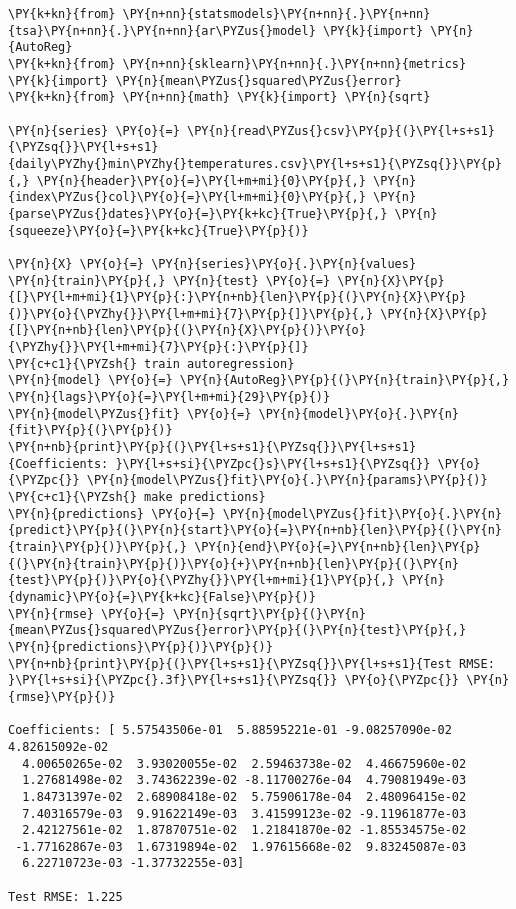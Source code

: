 \begin{tcolorbox}[breakable, size=fbox, boxrule=1pt, pad at break*=1mm,colback=cellbackground, colframe=cellborder]
\begin{Verbatim}[commandchars=\\\{\}]
\PY{k+kn}{from} \PY{n+nn}{statsmodels}\PY{n+nn}{.}\PY{n+nn}{tsa}\PY{n+nn}{.}\PY{n+nn}{ar\PYZus{}model} \PY{k}{import} \PY{n}{AutoReg}
\PY{k+kn}{from} \PY{n+nn}{sklearn}\PY{n+nn}{.}\PY{n+nn}{metrics} \PY{k}{import} \PY{n}{mean\PYZus{}squared\PYZus{}error}
\PY{k+kn}{from} \PY{n+nn}{math} \PY{k}{import} \PY{n}{sqrt}

\PY{n}{series} \PY{o}{=} \PY{n}{read\PYZus{}csv}\PY{p}{(}\PY{l+s+s1}{\PYZsq{}}\PY{l+s+s1}{daily\PYZhy{}min\PYZhy{}temperatures.csv}\PY{l+s+s1}{\PYZsq{}}\PY{p}{,} \PY{n}{header}\PY{o}{=}\PY{l+m+mi}{0}\PY{p}{,} \PY{n}{index\PYZus{}col}\PY{o}{=}\PY{l+m+mi}{0}\PY{p}{,} \PY{n}{parse\PYZus{}dates}\PY{o}{=}\PY{k+kc}{True}\PY{p}{,} \PY{n}{squeeze}\PY{o}{=}\PY{k+kc}{True}\PY{p}{)}

\PY{n}{X} \PY{o}{=} \PY{n}{series}\PY{o}{.}\PY{n}{values}
\PY{n}{train}\PY{p}{,} \PY{n}{test} \PY{o}{=} \PY{n}{X}\PY{p}{[}\PY{l+m+mi}{1}\PY{p}{:}\PY{n+nb}{len}\PY{p}{(}\PY{n}{X}\PY{p}{)}\PY{o}{\PYZhy{}}\PY{l+m+mi}{7}\PY{p}{]}\PY{p}{,} \PY{n}{X}\PY{p}{[}\PY{n+nb}{len}\PY{p}{(}\PY{n}{X}\PY{p}{)}\PY{o}{\PYZhy{}}\PY{l+m+mi}{7}\PY{p}{:}\PY{p}{]}
\PY{c+c1}{\PYZsh{} train autoregression}
\PY{n}{model} \PY{o}{=} \PY{n}{AutoReg}\PY{p}{(}\PY{n}{train}\PY{p}{,} \PY{n}{lags}\PY{o}{=}\PY{l+m+mi}{29}\PY{p}{)}
\PY{n}{model\PYZus{}fit} \PY{o}{=} \PY{n}{model}\PY{o}{.}\PY{n}{fit}\PY{p}{(}\PY{p}{)}
\PY{n+nb}{print}\PY{p}{(}\PY{l+s+s1}{\PYZsq{}}\PY{l+s+s1}{Coefficients: }\PY{l+s+si}{\PYZpc{}s}\PY{l+s+s1}{\PYZsq{}} \PY{o}{\PYZpc{}} \PY{n}{model\PYZus{}fit}\PY{o}{.}\PY{n}{params}\PY{p}{)}
\PY{c+c1}{\PYZsh{} make predictions}
\PY{n}{predictions} \PY{o}{=} \PY{n}{model\PYZus{}fit}\PY{o}{.}\PY{n}{predict}\PY{p}{(}\PY{n}{start}\PY{o}{=}\PY{n+nb}{len}\PY{p}{(}\PY{n}{train}\PY{p}{)}\PY{p}{,} \PY{n}{end}\PY{o}{=}\PY{n+nb}{len}\PY{p}{(}\PY{n}{train}\PY{p}{)}\PY{o}{+}\PY{n+nb}{len}\PY{p}{(}\PY{n}{test}\PY{p}{)}\PY{o}{\PYZhy{}}\PY{l+m+mi}{1}\PY{p}{,} \PY{n}{dynamic}\PY{o}{=}\PY{k+kc}{False}\PY{p}{)}
\PY{n}{rmse} \PY{o}{=} \PY{n}{sqrt}\PY{p}{(}\PY{n}{mean\PYZus{}squared\PYZus{}error}\PY{p}{(}\PY{n}{test}\PY{p}{,} \PY{n}{predictions}\PY{p}{)}\PY{p}{)}
\PY{n+nb}{print}\PY{p}{(}\PY{l+s+s1}{\PYZsq{}}\PY{l+s+s1}{Test RMSE: }\PY{l+s+si}{\PYZpc{}.3f}\PY{l+s+s1}{\PYZsq{}} \PY{o}{\PYZpc{}} \PY{n}{rmse}\PY{p}{)}

Coefficients: [ 5.57543506e-01  5.88595221e-01 -9.08257090e-02  4.82615092e-02
  4.00650265e-02  3.93020055e-02  2.59463738e-02  4.46675960e-02
  1.27681498e-02  3.74362239e-02 -8.11700276e-04  4.79081949e-03
  1.84731397e-02  2.68908418e-02  5.75906178e-04  2.48096415e-02
  7.40316579e-03  9.91622149e-03  3.41599123e-02 -9.11961877e-03
  2.42127561e-02  1.87870751e-02  1.21841870e-02 -1.85534575e-02
 -1.77162867e-03  1.67319894e-02  1.97615668e-02  9.83245087e-03
  6.22710723e-03 -1.37732255e-03]

Test RMSE: 1.225
\end{Verbatim}
\end{tcolorbox}

